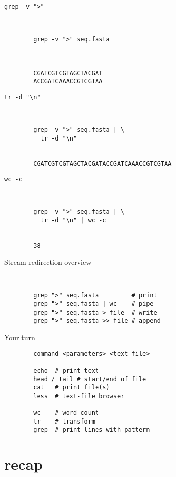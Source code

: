 \documentclass[xcolor=dvipsnames]{beamer}
\begin{document}
\begin{frame}[fragile]
	\huge
	\verb!grep -v ">"!
	\Large
	\begin{verbatim}


		grep -v ">" seq.fasta



		CGATCGTCGTAGCTACGAT
		ACCGATCAAACCGTCGTAA
	\end{verbatim}
\end{frame}

\begin{frame}[fragile]
	\huge
	\verb!tr -d "\n"!
	\Large
	\begin{verbatim}


		grep -v ">" seq.fasta | \
		  tr -d "\n"


		CGATCGTCGTAGCTACGATACCGATCAAACCGTCGTAA
	\end{verbatim}
\end{frame}

\begin{frame}[fragile]
	\huge
	\verb!wc -c!
	\Large
	\begin{verbatim}


		grep -v ">" seq.fasta | \
		  tr -d "\n" | wc -c


		38
	\end{verbatim}
\end{frame}

\begin{frame}[fragile]
	\huge
	Stream redirection overview
	\Large
	\begin{verbatim}


		grep ">" seq.fasta         # print
		grep ">" seq.fasta | wc    # pipe
		grep ">" seq.fasta > file  # write
		grep ">" seq.fasta >> file # append
	\end{verbatim}
\end{frame}

\begin{frame}[fragile]
	\huge
	Your turn
	\Large
	\begin{verbatim}
		command <parameters> <text_file>

		echo  # print text
		head / tail # start/end of file
		cat   # print file(s)
		less  # text-file browser

		wc    # word count
		tr    # transform
		grep  # print lines with pattern
	\end{verbatim}
\end{frame}

\section{recap}
\end{document}
